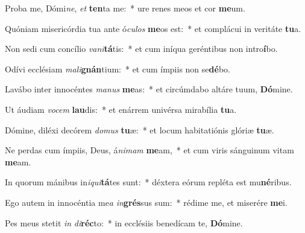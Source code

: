 \item Proba me, Dómi\textit{ne}, \textit{et} \textbf{ten}ta me:~* ure renes meos et cor \textbf{me}um.
\item Quóniam misericórdia tua ante ó\textit{cu}\textit{los} \textbf{me}os est:~* et complácui in veritáte \textbf{tu}a.
\item Non sedi cum concílio \textit{va}\textit{ni}\textbf{tá}tis:~* et cum iníqua geréntibus non intro\textbf{í}bo.
\item Odívi ecclésiam \textit{ma}\textit{li}\textbf{gnán}tium:~* et cum ímpiis non se\textbf{dé}bo.
\item Lavábo inter innocéntes \textit{ma}\textit{nus} \textbf{me}as:~* et circúmdabo altáre tuum, \textbf{Dó}mine.
\item Ut áudiam \textit{vo}\textit{cem} \textbf{lau}dis:~* et enárrem univérsa mirabília \textbf{tu}a.
\item Dómine, diléxi decórem \textit{do}\textit{mus} \textbf{tu}æ:~* et locum habitatiónis glóriæ \textbf{tu}æ.
\item Ne perdas cum ímpiis, Deus, á\textit{ni}\textit{mam} \textbf{me}am,~* et cum viris sánguinum vitam \textbf{me}am.
\item In quorum mánibus in\textit{i}\textit{qui}\textbf{tá}tes sunt:~* déxtera eórum repléta est mu\textbf{né}ribus.
\item Ego autem in innocéntia me\textit{a} \textit{in}\textbf{grés}sus sum:~* rédime me, et miserére \textbf{me}i.
\item Pes meus stetit \textit{in} \textit{di}\textbf{réc}to:~* in ecclésiis benedícam te, \textbf{Dó}mine.
